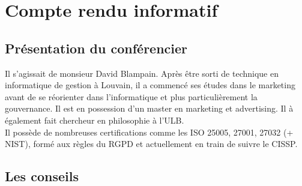 \documentclass[a4paper]{article}
\begin{document}
\let\cleardoublepage\clearpage


\newpage
\section{Compte rendu informatif}
\subsection{Présentation du conférencier}
Il s'agissait de monsieur David Blampain. Après être sorti de technique en informatique de gestion à Louvain, il a commencé ses études dans le marketing avant de se réorienter dans l'informatique et plus particulièrement la gouvernance. Il est en possession d'un master en marketing et advertising. Il à également fait chercheur en philosophie à l'ULB.\\
Il possède de nombreuses certifications comme les ISO 25005, 27001, 27032 (+ NIST), formé aux règles du RGPD et actuellement en train de suivre le CISSP.

\subsection{Les conseils}
\end{document}
